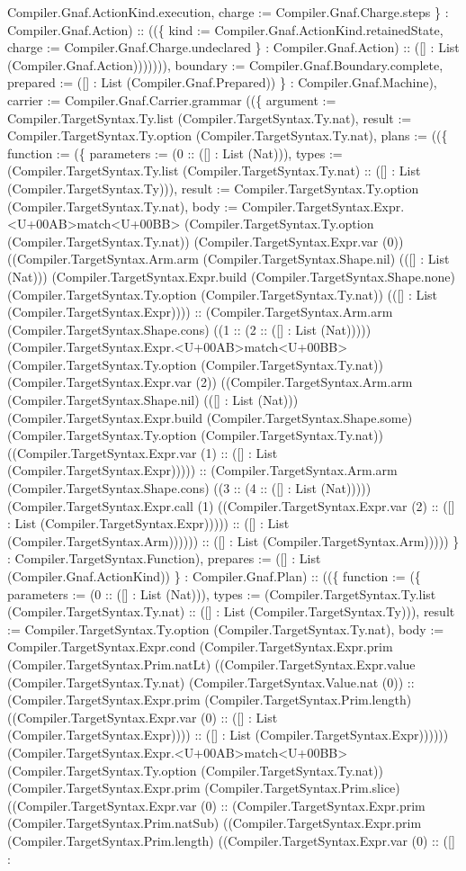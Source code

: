 \documentclass[11pt]{article}
\begin{document}
Compiler.Gnaf.ActionKind.execution, charge := Compiler.Gnaf.Charge.steps \} : Compiler.Gnaf.Action) :: ((\{ kind := Compiler.Gnaf.ActionKind.retainedState, charge := Compiler.Gnaf.Charge.undeclared \} : Compiler.Gnaf.Action) :: ([] : List (Compiler.Gnaf.Action))))))), boundary := Compiler.Gnaf.Boundary.complete, prepared := ([] : List (Compiler.Gnaf.Prepared)) \} : Compiler.Gnaf.Machine), carrier := Compiler.Gnaf.Carrier.grammar ((\{ argument := Compiler.TargetSyntax.Ty.list (Compiler.TargetSyntax.Ty.nat), result := Compiler.TargetSyntax.Ty.option (Compiler.TargetSyntax.Ty.nat), plans := ((\{ function := (\{ parameters := (0 :: ([] : List (Nat))), types := (Compiler.TargetSyntax.Ty.list (Compiler.TargetSyntax.Ty.nat) :: ([] : List (Compiler.TargetSyntax.Ty))), result := Compiler.TargetSyntax.Ty.option (Compiler.TargetSyntax.Ty.nat), body := Compiler.TargetSyntax.Expr.<U+00AB>match<U+00BB> (Compiler.TargetSyntax.Ty.option (Compiler.TargetSyntax.Ty.nat)) (Compiler.TargetSyntax.Expr.var (0)) ((Compiler.TargetSyntax.Arm.arm (Compiler.TargetSyntax.Shape.nil) (([] : List (Nat))) (Compiler.TargetSyntax.Expr.build (Compiler.TargetSyntax.Shape.none) (Compiler.TargetSyntax.Ty.option (Compiler.TargetSyntax.Ty.nat)) (([] : List (Compiler.TargetSyntax.Expr)))) :: (Compiler.TargetSyntax.Arm.arm (Compiler.TargetSyntax.Shape.cons) ((1 :: (2 :: ([] : List (Nat))))) (Compiler.TargetSyntax.Expr.<U+00AB>match<U+00BB> (Compiler.TargetSyntax.Ty.option (Compiler.TargetSyntax.Ty.nat)) (Compiler.TargetSyntax.Expr.var (2)) ((Compiler.TargetSyntax.Arm.arm (Compiler.TargetSyntax.Shape.nil) (([] : List (Nat))) (Compiler.TargetSyntax.Expr.build (Compiler.TargetSyntax.Shape.some) (Compiler.TargetSyntax.Ty.option (Compiler.TargetSyntax.Ty.nat)) ((Compiler.TargetSyntax.Expr.var (1) :: ([] : List (Compiler.TargetSyntax.Expr))))) :: (Compiler.TargetSyntax.Arm.arm (Compiler.TargetSyntax.Shape.cons) ((3 :: (4 :: ([] : List (Nat))))) (Compiler.TargetSyntax.Expr.call (1) ((Compiler.TargetSyntax.Expr.var (2) :: ([] : List (Compiler.TargetSyntax.Expr))))) :: ([] : List (Compiler.TargetSyntax.Arm)))))) :: ([] : List (Compiler.TargetSyntax.Arm))))) \} : Compiler.TargetSyntax.Function), prepares := ([] : List (Compiler.Gnaf.ActionKind)) \} : Compiler.Gnaf.Plan) :: ((\{ function := (\{ parameters := (0 :: ([] : List (Nat))), types := (Compiler.TargetSyntax.Ty.list (Compiler.TargetSyntax.Ty.nat) :: ([] : List (Compiler.TargetSyntax.Ty))), result := Compiler.TargetSyntax.Ty.option (Compiler.TargetSyntax.Ty.nat), body := Compiler.TargetSyntax.Expr.cond (Compiler.TargetSyntax.Expr.prim (Compiler.TargetSyntax.Prim.natLt) ((Compiler.TargetSyntax.Expr.value (Compiler.TargetSyntax.Ty.nat) (Compiler.TargetSyntax.Value.nat (0)) :: (Compiler.TargetSyntax.Expr.prim (Compiler.TargetSyntax.Prim.length) ((Compiler.TargetSyntax.Expr.var (0) :: ([] : List (Compiler.TargetSyntax.Expr)))) :: ([] : List (Compiler.TargetSyntax.Expr)))))) (Compiler.TargetSyntax.Expr.<U+00AB>match<U+00BB> (Compiler.TargetSyntax.Ty.option (Compiler.TargetSyntax.Ty.nat)) (Compiler.TargetSyntax.Expr.prim (Compiler.TargetSyntax.Prim.slice) ((Compiler.TargetSyntax.Expr.var (0) :: (Compiler.TargetSyntax.Expr.prim (Compiler.TargetSyntax.Prim.natSub) ((Compiler.TargetSyntax.Expr.prim (Compiler.TargetSyntax.Prim.length) ((Compiler.TargetSyntax.Expr.var (0) :: ([] : 
\end{document}
